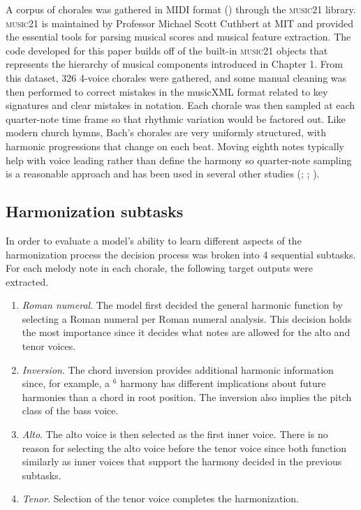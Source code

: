\documentclass[11pt]{article}
\begin{document}
A corpus of chorales was gathered in MIDI format (\cite{greentree2005}) through the \textsc{music21} library. \textsc{music21} is maintained by Professor Michael Scott Cuthbert at MIT and provided the essential tools for parsing musical scores and musical feature extraction. The code developed for this paper builds off of the built-in \textsc{music21} objects that represents the hierarchy of musical components introduced in Chapter 1. From this dataset, 326 4-voice chorales were gathered, and some manual cleaning was then performed to correct mistakes in the musicXML format related to key signatures and clear mistakes in notation. Each chorale was then sampled at each quarter-note time frame so that rhythmic variation would be factored out. Like modern church hymns, Bach's chorales are very uniformly structured, with harmonic progressions that change on each beat. Moving eighth notes typically help with voice leading rather than define the harmony so quarter-note sampling is a reasonable approach and has been used in several other studies (\cite{hild1992harmonet}; \cite{madsen2002}; \cite{kaliakatsos2014}).

\subsection{Harmonization subtasks}

In order to evaluate a model's ability to learn different aspects of the harmonization process the decision process was broken into 4 sequential subtasks. For each melody note in each chorale, the following target outputs were extracted.

\begin{enumerate}
\item \textit{Roman numeral}. The model first decided the general harmonic function by selecting a Roman numeral per Roman numeral analysis. This decision holds the most importance since it decides what notes are allowed for the alto and tenor voices.
\item \textit{Inversion}. The chord inversion provides additional harmonic information since, for example, a $^6$ harmony has different implications about future harmonies than a  chord in root position. The inversion also implies the pitch class of the bass voice.
\item \textit{Alto}. The alto voice is then selected as the first inner voice. There is no reason for selecting the alto voice before the tenor voice since both function similarly as inner voices that support the harmony decided in the previous subtasks.
\item \textit{Tenor}. Selection of the tenor voice completes the harmonization.
\end{enumerate}
\end{document}
